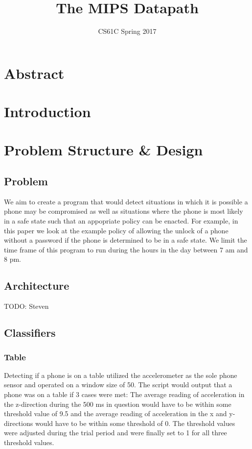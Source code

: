 \documentclass{article}
\title{The MIPS Datapath}
\author{CS61C Spring 2017}
\date{ }
\begin{document}
\maketitle
\tableofcontents
\newpage

\section{Abstract}
\section{Introduction}

\section{Problem Structure \& Design}
\subsection{Problem}
\indent We aim to create a program that would detect situations in which it is possible a phone may be compromised as well as situations where the phone is most likely in a safe state such that an appopriate policy can be enacted. 
For example, in this paper we look at the example policy of allowing the unlock of a phone without a password if the phone is determined to be in a safe state. 
We limit the time frame of this program to run during the hours in the day between 7 am and 8 pm. 
\subsection{Architecture}
TODO: Steven
\subsection{Classifiers}
\subsubsection{Table}
\indent Detecting if a phone is on a table utilized the accelerometer as the sole phone sensor and operated on a window size of 50. 
The script would output that a phone was on a table if 3 cases were met: 
The average reading of acceleration in the z-direction during the 500 ms in question would have to be within some threshold value of 9.5 and the average reading of acceleration in the x and y-directions would have to be within some threshold of 0.  
The threshold values were adjusted during the trial period and were finally set to 1 for all three threshold values. 
\end{document}
